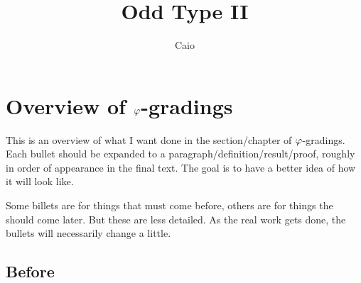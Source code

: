 \documentclass{amsbook}
\begin{document}


\author[Caio]{Caio}
\address{Department of Mathematics and Statistics,
	Memorial University of Newfoundland,
St. John's, NL, A1C5S7, Canada}




\date{}

\title{Odd Type II}





\maketitle



\chapter{Overview of $\varphi$-gradings}

This is an overview of what I want done in the section/chapter of $\varphi$-gradings. Each bullet should be expanded to a paragraph/definition/result/proof, roughly in order of appearance in the final text. The goal is to have a better idea of how it will look like.

Some billets are for things that must come before, others are for things the should come later. But these are less detailed. As the real work gets done, the bullets will necessarily change a little.

\section{Before}
\end{document}
